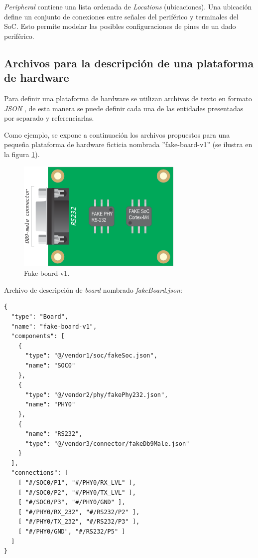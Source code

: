 \emph{Peripheral} contiene una lista ordenada de \emph{Locations} (ubicaciones). Una ubicación define un conjunto de conexiones entre señales del periférico y terminales del SoC. Esto permite modelar las posibles configuraciones de pines de un dado periférico.

\subsection{Archivos para la descripción de una plataforma de hardware}

Para definir una plataforma de hardware se utilizan archivos de texto en formato \emph{JSON} \citep{JSON}, de esta manera se puede definir cada una de las entidades presentadas por separado y referenciarlas. 

Como ejemplo, se expone a continuación los archivos propuestos para una pequeña plataforma de hardware ficticia nombrada ''fake-board-v1'' (se ilustra en la figura \ref{fig:fakeBoard}). 

\begin{figure}[!htbp]
\begin{center}  %
\includegraphics*[width=8cm]{Figures/FakeBoard-01.pdf}
\par\caption{Fake-board-v1.}\label{fig:fakeBoard}
\end{center}
\end{figure}

Archivo de descripción de \emph{board} nombrado \emph{fakeBoard.json}:

\begin{verbatim}
{
  "type": "Board",
  "name": "fake-board-v1",
  "components": [
    {
      "type": "@/vendor1/soc/fakeSoc.json",
      "name": "SOC0"
    },
    {
      "type": "@/vendor2/phy/fakePhy232.json",
      "name": "PHY0"
    },
    {
      "name": "RS232",
      "type": "@/vendor3/connector/fakeDb9Male.json"
    }
  ],
  "connections": [
    [ "#/SOC0/P1", "#/PHY0/RX_LVL" ],
    [ "#/SOC0/P2", "#/PHY0/TX_LVL" ],
    [ "#/SOC0/P3", "#/PHY0/GND" ],
    [ "#/PHY0/RX_232", "#/RS232/P2" ],
    [ "#/PHY0/TX_232", "#/RS232/P3" ],
    [ "#/PHY0/GND", "#/RS232/P5" ]
  ]
}
\end{verbatim}

